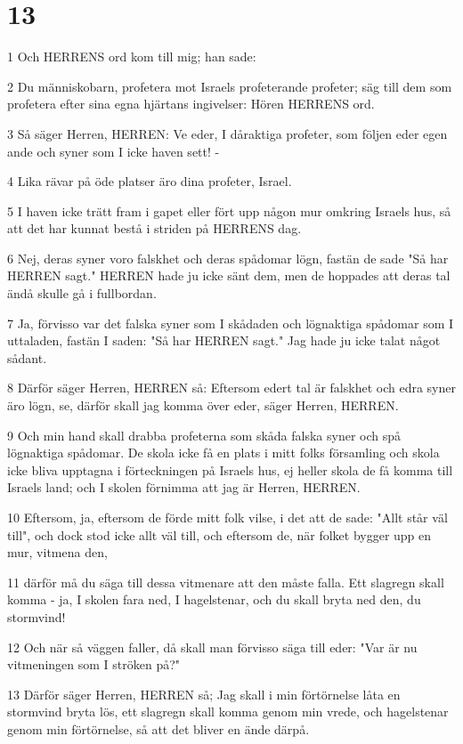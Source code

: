 \chapter{13}

\par 1 Och HERRENS ord kom till mig; han sade:
\par 2 Du människobarn, profetera mot Israels profeterande profeter; säg till dem som profetera efter sina egna hjärtans ingivelser: Hören HERRENS ord.
\par 3 Så säger Herren, HERREN: Ve eder, I dåraktiga profeter, som följen eder egen ande och syner som I icke haven sett! -
\par 4 Lika rävar på öde platser äro dina profeter, Israel.
\par 5 I haven icke trätt fram i gapet eller fört upp någon mur omkring Israels hus, så att det har kunnat bestå i striden på HERRENS dag.
\par 6 Nej, deras syner voro falskhet och deras spådomar lögn, fastän de sade "Så har HERREN sagt." HERREN hade ju icke sänt dem, men de hoppades att deras tal ändå skulle gå i fullbordan.
\par 7 Ja, förvisso var det falska syner som I skådaden och lögnaktiga spådomar som I uttaladen, fastän I saden: "Så har HERREN sagt." Jag hade ju icke talat något sådant.
\par 8 Därför säger Herren, HERREN så: Eftersom edert tal är falskhet och edra syner äro lögn, se, därför skall jag komma över eder, säger Herren, HERREN.
\par 9 Och min hand skall drabba profeterna som skåda falska syner och spå lögnaktiga spådomar. De skola icke få en plats i mitt folks församling och skola icke bliva upptagna i förteckningen på Israels hus, ej heller skola de få komma till Israels land; och I skolen förnimma att jag är Herren, HERREN.
\par 10 Eftersom, ja, eftersom de förde mitt folk vilse, i det att de sade: "Allt står väl till", och dock stod icke allt väl till, och eftersom de, när folket bygger upp en mur, vitmena den,
\par 11 därför må du säga till dessa vitmenare att den måste falla. Ett slagregn skall komma - ja, I skolen fara ned, I hagelstenar, och du skall bryta ned den, du stormvind!
\par 12 Och när så väggen faller, då skall man förvisso säga till eder: "Var är nu vitmeningen som I ströken på?"
\par 13 Därför säger Herren, HERREN så; Jag skall i min förtörnelse låta en stormvind bryta lös, ett slagregn skall komma genom min vrede, och hagelstenar genom min förtörnelse, så att det bliver en ände därpå.
